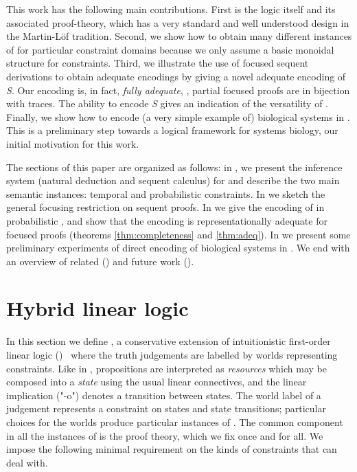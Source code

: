 \documentclass{article}
\newcommand\proofsystem[1]{{\smaller\rmfamily\slshape #1}\xspace}
\newcommand\Spi{\proofsystem{S}}
\begin{document}
This work has the following main contributions.
First is the logic \hyll itself and its associated proof-theory, which has a
very standard and well understood design in the Martin-Löf tradition.
Second, we show how to obtain many different instances of \hyll for particular
constraint domains because we only assume a basic monoidal structure for
constraints.
Third, we illustrate the use of focused sequent derivations to obtain adequate
encodings by giving a novel adequate encoding of \Spi.
Our encoding is, in fact, \emph{fully adequate}, \ie, partial focused proofs are
in bijection with traces.
The ability to encode \Spi gives an indication of the versatility of \hyll.
Finally, we show how to encode (a very simple example of) biological systems in \hyll.
This is a preliminary step
towards a logical framework for systems biology, our initial motivation for this work.

The sections of this paper are organized as follows: in , we
present the inference system (natural deduction and sequent calculus) for \hyll
and describe the two main semantic instances: temporal and probabilistic constraints.  
In  we sketch the general focusing restriction on \hyll sequent
proofs. 
In  we give the encoding of \spi in probabilistic \hyll, and show that
the encoding is representationally adequate for focused proofs
(theorems \ref{thm:completeness} and \ref{thm:adeq}).  
In  we present some preliminary experiments of direct encoding of 
biological systems in \hyll.
We end with an overview of related () and future work 
().

\section{Hybrid linear logic}
\label{sec:hyll}

In this section we define \hyll, a conservative extension of intuitionistic
first-order linear logic (\ill)~\cite{girard87tcs} where the truth judgements
are labelled by worlds representing constraints. Like in \ill, propositions are
interpreted as \emph{resources} which may be composed into a \emph{state} using
the usual linear connectives, and the linear implication ("-o") denotes a
transition between states. The world label of a judgement represents a
constraint on states and state transitions; particular choices for the worlds
produce particular instances of \hyll. The common component in all the instances
of \hyll is the proof theory, which we fix once and for all. We impose the
following minimal requirement on the kinds of constraints that \hyll can deal
with.
\end{document}
